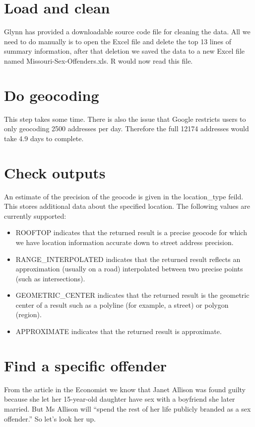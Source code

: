\documentclass[a4paper]{article}
\begin{document}
\section{Load and clean}
\label{sec-4}

Glynn has provided a downloadable source code file for cleaning the
data.  All we need to do manually is to open the Excel file and delete
the top 13 lines of summary information, after that deletion we saved
the data to a new Excel file named Missouri-Sex-Offenders.xls.  R
would now read this file.
\section{Do geocoding}
\label{sec-5}

This step takes some time.  There is also the issue that Google restricts users to only geocoding 2500 addresses per day.  Therefore the full 12174 addresses would take 4.9 days to complete.
\section{Check outputs}
\label{sec-6}




An estimate of the precision of the geocode is given in the location\_type feild.  This stores additional data about the specified location. The following values are currently supported:
\begin{itemize}
\item ROOFTOP indicates that the returned result is a precise geocode for which we have location information accurate down to street address precision.
\item RANGE\_INTERPOLATED indicates that the returned result reflects an approximation (usually on a road) interpolated between two precise points (such as intersections). 
\item GEOMETRIC\_CENTER indicates that the returned result is the geometric center of a result such as a polyline (for example, a street) or polygon (region).
\item APPROXIMATE indicates that the returned result is approximate.
\end{itemize}
\section{Find a specific offender}
\label{sec-7}

From the article in the Economist \cite{TheEconomi2009} we know that Janet Allison was found guilty because she let her 15-year-old daughter have sex with a boyfriend she later married. But Ms Allison will ``spend the rest of her life publicly branded as a sex offender.'' So let's look her up.
\end{document}
